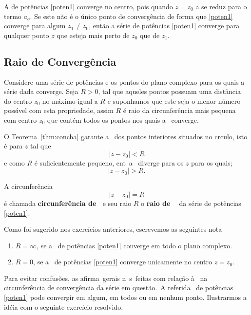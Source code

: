 \begin{obs}
A \ser de pot\^{e}ncias \eqref{poten1} converge no centro, pois quando
$z=z_{0}$ a \ser se reduz para o termo $a_o$. Se este não \'e o
\'{u}nico ponto de convergência de forma que  \eqref{poten1} converge
para algum $z_1\neq z_{0}$, ent\~{a}o  a s\'{e}rie de pot\^{e}ncias
\eqref{poten1} converge para qualquer ponto $z$ que esteja mais
perto de $z_{0}$ que de $z_1$.
\end{obs}

\subsection{Raio de Converg\^encia} 
Considere uma s\'{e}rie de
pot\^{e}ncias e os  pontos do plano complexo para os quais a s\'{e}rie
dada converge. Seja $R>0$, tal que aqueles pontos possuam uma
dist\^ancia do centro $z_{0}$ no m\'{a}ximo igual a $R$ e suponhamos que
este seja o menor n\'umero poss\'{\i}vel com esta propriedade, assim
$R$ \'e raio da circunfer\^{e}ncia mais pequena com centro $z_{0}$ que
cont\'em todos os pontos nos quais a \ser\ converge.

O Teorema~\ref{thm:concha} garante a \conver\ dos pontos interiores
situados no c\ii rculo, isto \'e para $z$ tal que
\begin{equation}\label{raio1}
  |z-z_{0}|<R
\end{equation}
e como $R$ \'e suficientemente pequeno, ent\ao\ a \ser\ diverge
para os $z$ para os quais;
\begin{equation*}
  |z-z_{0}|>R.
\end{equation*}

A circunfer\^{e}ncia
\begin{equation*}
  |z-z_{0}|=R
\end{equation*}
\'e chamada \textbf{circunfer\^{e}ncia de \conver\ }e seu raio $R$ o
\textbf{raio de \conver\ } da s\'{e}rie de pot\^{e}ncias \eqref{poten1}.

Como foi sugerido nos exercícios anteriores, escrevemos as seguintes
nota\coes\
\begin{enumerate}[label=(\alph*),leftmargin=3em]
  \item $R=\infty$, se a \ser\ de pot\^{e}ncias \eqref{poten1} converge em todo o
  plano complexo.
  \item $R=0$, se a \ser\ de pot\^{e}ncias \eqref{poten1} converge unicamente no centro $z=z_0$.
\end{enumerate}

Para evitar  confus\~{o}es, as afirma\coes\ gerais n\ao\ s\ao\ feitas
com rela\c{c}\~{a}o \`{a} \conver\ na circunfer\^{e}ncia de converg\^{e}ncia da s\'{e}rie
em quest\~{a}o.\ A referida \ser\ de pot\^{e}ncias \eqref{poten1} pode
convergir em algum, em todos ou em nenhum ponto. Ilustrarmos a
id\'{e}ia com o seguinte exercício resolvido.

